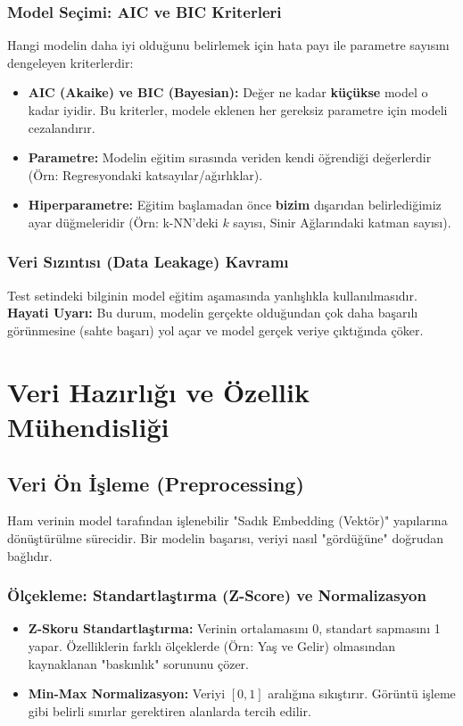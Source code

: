 \documentclass[12pt,a4paper]{article}
\begin{document}
\subsubsection{Model Seçimi: AIC ve BIC Kriterleri}
Hangi modelin daha iyi olduğunu belirlemek için hata payı ile parametre sayısını dengeleyen kriterlerdir:
\begin{itemize}
    \item \textbf{AIC (Akaike) ve BIC (Bayesian):} Değer ne kadar \textbf{küçükse} model o kadar iyidir. Bu kriterler, modele eklenen her gereksiz parametre için modeli cezalandırır.
\end{itemize}
\begin{itemize}
    \item \textbf{Parametre:} Modelin eğitim sırasında veriden kendi öğrendiği değerlerdir (Örn: Regresyondaki katsayılar/ağırlıklar).
    \item \textbf{Hiperparametre:} Eğitim başlamadan önce \textbf{bizim} dışarıdan belirlediğimiz ayar düğmeleridir (Örn: k-NN'deki $k$ sayısı, Sinir Ağlarındaki katman sayısı).
\end{itemize}

\subsubsection{Veri Sızıntısı (Data Leakage) Kavramı}
Test setindeki bilginin model eğitim aşamasında yanlışlıkla kullanılmasıdır. \textbf{Hayati Uyarı:} Bu durum, modelin gerçekte olduğundan çok daha başarılı görünmesine (sahte başarı) yol açar ve model gerçek veriye çıktığında çöker.




\newpage
\section{Veri Hazırlığı ve Özellik Mühendisliği}

\subsection{Veri Ön İşleme (Preprocessing)}
Ham verinin model tarafından işlenebilir "Sadık Embedding (Vektör)" yapılarına dönüştürülme sürecidir. Bir modelin başarısı, veriyi nasıl "gördüğüne" doğrudan bağlıdır.

\subsubsection{Ölçekleme: Standartlaştırma (Z-Score) ve Normalizasyon}
\begin{itemize}
    \item \textbf{Z-Skoru Standartlaştırma:} Verinin ortalamasını 0, standart sapmasını 1 yapar. Özelliklerin farklı ölçeklerde (Örn: Yaş ve Gelir) olmasından kaynaklanan "baskınlık" sorununu çözer.
    \item \textbf{Min-Max Normalizasyon:} Veriyi $[0, 1]$ aralığına sıkıştırır. Görüntü işleme gibi belirli sınırlar gerektiren alanlarda tercih edilir.
\end{itemize}
\end{document}

